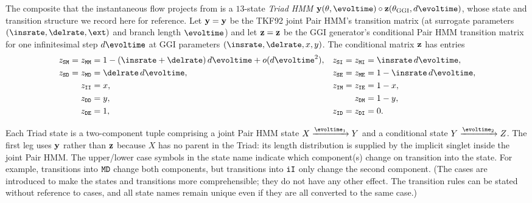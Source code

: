 The composite that the instantaneous flow projects from is a $13$-state
\emph{Triad HMM}
$\jointpairhmm(\theta,\evoltime)\circ\condpairhmm(\theta_\ggi,d\evoltime)$,
whose state and transition structure we record here for reference.  Let
$\mathbf{y}=\mathbf{y}$ be the TKF92 joint Pair HMM's transition matrix (at
surrogate parameters $(\insrate,\delrate,\fragext)$ and branch length
$\evoltime$) and let $\mathbf{z}=\mathbf{z}$ be the GGI generator's
conditional Pair HMM transition matrix for one infinitesimal step
$d\evoltime$ at GGI parameters $(\insrate,\delrate,x,y)$.  The conditional
matrix $\mathbf{z}$ has entries
\begin{align*}
\tz{\sta\mat} = \tz{\mat\mat} &= 1 - (\insrate+\delrate)\,d\evoltime + o(d\evoltime^2), &
\tz{\sta\ins} = \tz{\mat\ins} &= \insrate\,d\evoltime, \\
\tz{\sta\del} = \tz{\mat\del} &= \delrate\,d\evoltime, &
\tz{\sta\fin} = \tz{\mat\fin} &= 1 - \insrate\,d\evoltime, \\
\tz{\ins\ins} &= x, & \tz{\ins\mat} = \tz{\ins\fin} &= 1-x, \\
\tz{\del\del} &= y, & \tz{\del\mat} &= 1-y, \\
\tz{\del\fin} &= 1, & \tz{\ins\del} = \tz{\del\ins} &= 0.
\end{align*}

Each Triad state is a two-component tuple comprising a joint Pair HMM state
$X \xrightarrow{\evoltime_1} Y$ and a conditional state
$Y \xrightarrow{\evoltime_2} Z$.  The first leg uses $\mathbf{y}$ rather
than $\mathbf{z}$ because $X$ has no parent in the Triad: its length
distribution is supplied by the implicit singlet inside the joint Pair HMM.
The upper/lower case symbols in the state name indicate which component(s)
change on transition into the state.  For example, transitions into $\mathtt{MD}$
change both components, but transitions into $\mathtt{iI}$ only change the
second component.  (The cases are introduced to make the states and
transitions more comprehensible; they do not have any other effect.  The
transition rules can be stated without reference to cases, and all state
names remain unique even if they are all converted to the same case.)

